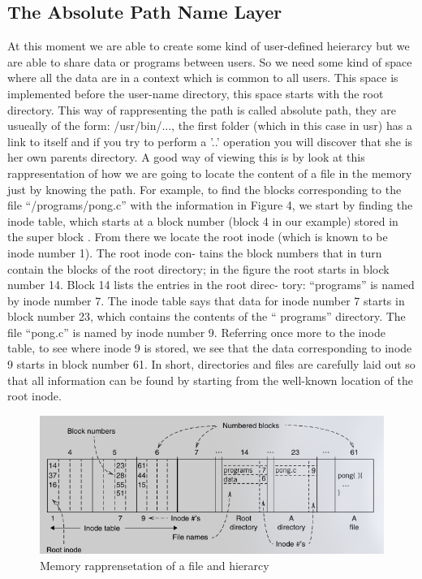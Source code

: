 \documentclass{article}
\begin{document}
    \subsection{The Absolute Path Name Layer}
      At this moment we are able to create some kind of user-defined heierarcy but we are 
      able to share data or programs between users. So we need some kind of space where
      all the data are in a context which is common to all users. This space is implemented 
      before the user-name directory, this space starts with the root directory. This way
      of rappresenting the path is called absolute path, they are usueally of the 
      form: /usr/bin/..., the first folder (which in this case in usr) has a link to itself
      and if you try to perform a '..' operation you will discover that she is her own parents
      directory. A good way of viewing this is by look at this rappresentation of how we 
      are going to locate the content of a file in the memory just by knowing the path. 
      For example, to find the blocks corresponding to the file “/programs/pong.c” with 
      the information in Figure 4, we start by finding the inode table, which starts 
      at a block number (block 4 in our example) stored in the super block . From there we 
      locate the root inode (which is known to be inode number 1).  The root inode con-
      tains the block numbers that in turn contain the blocks of the root directory; in the 
      figure the root starts in block number 14. Block 14 lists the entries in the root direc-
      tory: “programs” is named by inode number 7.  The inode table says that data for inode 
      number 7 starts in block number 23, which contains the contents of the “ programs” 
      directory.  The file “pong.c” is named by inode number 9. Referring once more to the 
      inode table, to see where inode 9 is stored, we see that the data corresponding to 
      inode 9 starts in block number 61. In short, directories and files are carefully laid out 
      so that all information can be found by starting from the well-known location of the 
      root inode.
      \begin{figure}[ht]
        \centering
        \includegraphics[width=.8\textwidth]{images/path-to-file.png}
        \caption{Memory rapprensetation of a file and hierarcy}
        \label{fig:mesh4}
      \end{figure}
\end{document}
